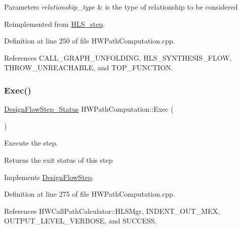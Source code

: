 \begin{DoxyParams}{Parameters}
{\em relationship\+\_\+type} & is the type of relationship to be considered \\
\hline
\end{DoxyParams}


Reimplemented from \hyperlink{classHLS__step_aed0ce8cca9a1ef18e705fc1032ad4de5}{H\+L\+S\+\_\+step}.



Definition at line 250 of file H\+W\+Path\+Computation.\+cpp.



References C\+A\+L\+L\+\_\+\+G\+R\+A\+P\+H\+\_\+\+U\+N\+F\+O\+L\+D\+I\+NG, H\+L\+S\+\_\+\+S\+Y\+N\+T\+H\+E\+S\+I\+S\+\_\+\+F\+L\+OW, T\+H\+R\+O\+W\+\_\+\+U\+N\+R\+E\+A\+C\+H\+A\+B\+LE, and T\+O\+P\+\_\+\+F\+U\+N\+C\+T\+I\+ON.

\mbox{\label{classHWPathComputation_add5efabc2eea4a6167863ceca3c50b0e}} 
\subsubsection{\texorpdfstring{Exec()}{Exec()}}
{\footnotesize\ttfamily \hyperlink{design__flow__step_8hpp_afb1f0d73069c26076b8d31dbc8ebecdf}{Design\+Flow\+Step\+\_\+\+Status} H\+W\+Path\+Computation\+::\+Exec (\begin{DoxyParamCaption}{ }\end{DoxyParamCaption})\hspace{0.3cm}{\ttfamily [virtual]}}



Execute the step. 

\begin{DoxyReturn}{Returns}
the exit status of this step 
\end{DoxyReturn}


Implements \hyperlink{classDesignFlowStep_a77d7e38493016766098711ea24f60b89}{Design\+Flow\+Step}.



Definition at line 275 of file H\+W\+Path\+Computation.\+cpp.



References H\+W\+Call\+Path\+Calculator\+::\+H\+L\+S\+Mgr, I\+N\+D\+E\+N\+T\+\_\+\+O\+U\+T\+\_\+\+M\+EX, O\+U\+T\+P\+U\+T\+\_\+\+L\+E\+V\+E\+L\+\_\+\+V\+E\+R\+B\+O\+SE, and S\+U\+C\+C\+E\+SS.

